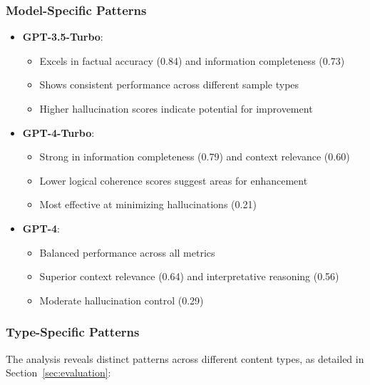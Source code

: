 \subsubsection{Model-Specific Patterns}
\begin{itemize}
    \item \textbf{GPT-3.5-Turbo}:
    \begin{itemize}
        \item Excels in factual accuracy (0.84) and information completeness (0.73)
        \item Shows consistent performance across different sample types
        \item Higher hallucination scores indicate potential for improvement
    \end{itemize}
    
    \item \textbf{GPT-4-Turbo}:
    \begin{itemize}
        \item Strong in information completeness (0.79) and context relevance (0.60)
        \item Lower logical coherence scores suggest areas for enhancement
        \item Most effective at minimizing hallucinations (0.21)
    \end{itemize}
    
    \item \textbf{GPT-4}:
    \begin{itemize}
        \item Balanced performance across all metrics
        \item Superior context relevance (0.64) and interpretative reasoning (0.56)
        \item Moderate hallucination control (0.29)
    \end{itemize}
\end{itemize}

\subsubsection{Type-Specific Patterns}
The analysis reveals distinct patterns across different content types, as detailed in Section~\ref{sec:evaluation}:

